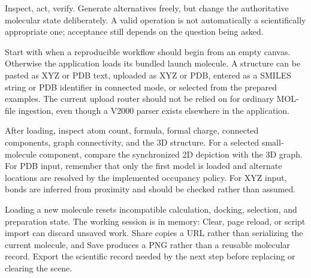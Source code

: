 Inspect, act, verify. Generate alternatives freely, but change the authoritative molecular state deliberately. A valid operation is not automatically a scientifically appropriate one; acceptance still depends on the question being asked.


Start with  when a reproducible workflow should begin from an empty canvas. Otherwise the application loads its bundled launch molecule. A structure can be pasted as XYZ or PDB text, uploaded as XYZ or PDB, entered as a SMILES string or PDB identifier in connected mode, or selected from the prepared examples. The current upload router should not be relied on for ordinary MOL-file ingestion, even though a V2000 parser exists elsewhere in the application.

After loading, inspect atom count, formula, formal charge, connected components, graph connectivity, and the 3D structure. For a selected small-molecule component, compare the synchronized 2D depiction with the 3D graph. For PDB input, remember that only the first model is loaded and alternate locations are resolved by the implemented occupancy policy. For XYZ input, bonds are inferred from proximity and should be checked rather than assumed.


Loading a new molecule resets incompatible calculation, docking, selection, and preparation state. The working session is in memory: Clear, page reload, or script import can discard unsaved work. Share copies a URL rather than serializing the current molecule, and Save produces a PNG rather than a reusable molecular record. Export the scientific record needed by the next step before replacing or clearing the scene.

